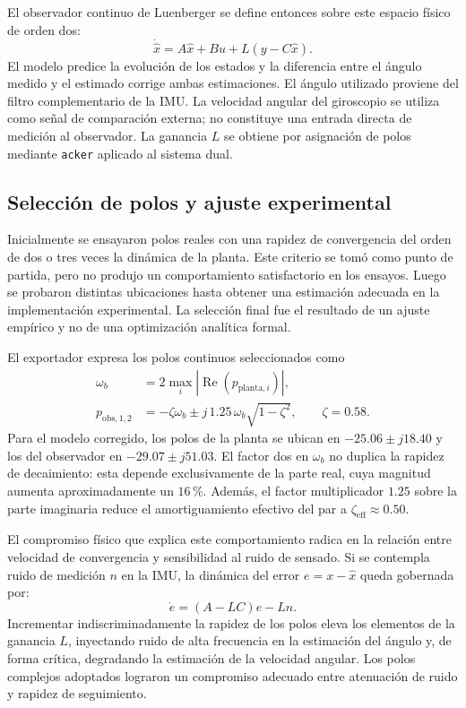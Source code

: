 \documentclass[a4paper, twoside, 10pt, spanish]{article}
\numberwithin{table}{section}
\begin{document}
El observador continuo de Luenberger se define entonces sobre este espacio físico de orden dos:
\begin{equation}
\dot{\hat x} = A\hat x + Bu + L(y - C\hat x).
\end{equation}
El modelo predice la evolución de los estados y la diferencia entre el ángulo medido y el estimado corrige ambas estimaciones. El ángulo utilizado proviene del filtro complementario de la IMU. La velocidad angular del giroscopio se utiliza como señal de comparación externa; no constituye una entrada directa de medición al observador. La ganancia $L$ se obtiene por asignación de polos mediante \texttt{acker} aplicado al sistema dual.

\subsection{Selección de polos y ajuste experimental}
Inicialmente se ensayaron polos reales con una rapidez de convergencia del orden de dos o tres veces la dinámica de la planta. Este criterio se tomó como punto de partida, pero no produjo un comportamiento satisfactorio en los ensayos. Luego se probaron distintas ubicaciones hasta obtener una estimación adecuada en la implementación experimental. La selección final fue el resultado de un ajuste empírico y no de una optimización analítica formal.

El exportador expresa los polos continuos seleccionados como
\begin{align}
\omega_b &= 2\max_i |\operatorname{Re}(p_{\mathrm{planta},i})|, \\
p_{\mathrm{obs},1,2} &= -\zeta\omega_b \pm j\,1.25\,\omega_b\sqrt{1-\zeta^2}, \qquad \zeta=0.58.
\end{align}
Para el modelo corregido, los polos de la planta se ubican en $-25.06 \pm j18.40$ y los del observador en $-29.07 \pm j51.03$. El factor dos en $\omega_b$ no duplica la rapidez de decaimiento: esta depende exclusivamente de la parte real, cuya magnitud aumenta aproximadamente un $16\,\%$. Además, el factor multiplicador $1.25$ sobre la parte imaginaria reduce el amortiguamiento efectivo del par a $\zeta_{\mathrm{eff}} \approx 0.50$.

El compromiso físico que explica este comportamiento radica en la relación entre velocidad de convergencia y sensibilidad al ruido de sensado. Si se contempla ruido de medición $n$ en la IMU, la dinámica del error $e = x - \hat x$ queda gobernada por:
\begin{equation}
\dot e = (A - LC)e - Ln.
\end{equation}
Incrementar indiscriminadamente la rapidez de los polos eleva los elementos de la ganancia $L$, inyectando ruido de alta frecuencia en la estimación del ángulo y, de forma crítica, degradando la estimación de la velocidad angular. Los polos complejos adoptados lograron un compromiso adecuado entre atenuación de ruido y rapidez de seguimiento.
\end{document}
